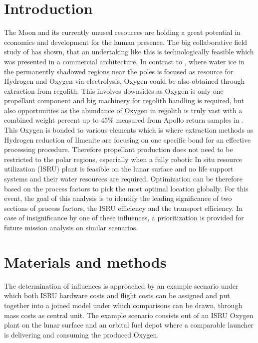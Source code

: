 \documentclass[utf8]{FrontiersinHarvard} %
\begin{document}
\section{Introduction}


The Moon and its currently unused resources are holding a great potential in economics and development for the human presence.
The big collaborative field study of \cite{Kornuta2019} has shown, that an undertaking like this is technologically feasible which was presented in a commercial architecture. In contrast to \cite{Kornuta2019}, where water ice in the permanently shadowed regions near the poles is focused as resource for Hydrogen and Oxygen via electrolysis, Oxygen could be also obtained through extraction from regolith.
This involves downsides as Oxygen is only one propellant component and big machinery for regolith handling is required, but also opportunities as the abundance of Oxygen in regolith is truly vast with a combined weight percent up to 45\% measured from Apollo return samples in \cite{Papike1982}.
This Oxygen is bonded to various elements which is where extraction methods as Hydrogen reduction of Ilmenite are focusing on one specific bond for an effective processing procedure.
Therefore propellant production does not need to be restricted to the polar regions, especially when a fully robotic In situ resource utilization (ISRU) plant is feasible on the lunar surface and no life support systems and their water resources are required. 
Optimization can be therefore based on the process factors to pick the most optimal location globally.
For this event, the goal of this analysis is to identify the leading significance of two sections of process factors, the ISRU efficiency and the transport efficiency.
In case of insignificance by one of these influences, a prioritization is provided for future mission analysis on similar scenarios.


\section{Materials and methods}

The determination of influences is approached by an example scenario under which both ISRU hardware costs and flight costs can be assigned and put together into a joined model under which comparisons can be drawn, through mass costs as central unit.
The example scenario consists out of an ISRU Oxygen plant on the lunar surface and an orbital fuel depot where a comparable launcher is delivering and consuming the produced Oxygen.
\end{document}
